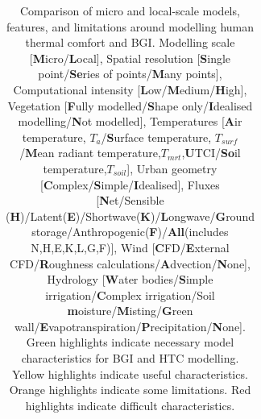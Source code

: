 \begin{table}
\begin{tabular}{c c c c c c c c c c c}
\end{tabular}
\caption{\label{tab:modelcompare}Comparison of micro and local-scale models, features, and limitations around modelling human thermal comfort and BGI. Modelling scale [\textbf{M}icro/\textbf{L}ocal], Spatial resolution [\textbf{S}ingle point/\textbf{Se}ries of points/\textbf{M}any points], Computational intensity [\textbf{L}ow/\textbf{M}edium/\textbf{H}igh], Vegetation [\textbf{F}ully modelled/\textbf{S}hape only/\textbf{I}dealised modelling/\textbf{N}ot modelled], Temperatures [\textbf{A}ir temperature, $T_{a}$/\textbf{S}urface temperature, $T_{surf}$/\textbf{M}ean radiant temperature,$T_{mrt}$,\textbf{U}TCI/\textbf{So}il temperature,$T_{soil}$], Urban geometry [\textbf{C}omplex/\textbf{S}imple/\textbf{I}dealised], Fluxes [\textbf{N}et/Sensible (\textbf{H})/Latent(\textbf{E})/Shortwave(\textbf{K})/\textbf{L}ongwave/\textbf{G}round storage/Anthropogenic(\textbf{F})/\textbf{All}(includes N,H,E,K,L,G,F)], Wind [\textbf{C}FD/\textbf{E}xternal CFD/\textbf{R}oughness calculations/\textbf{A}dvection/\textbf{N}one], Hydrology [\textbf{W}ater bodies/\textbf{S}imple irrigation/\textbf{C}omplex irrigation/Soil \textbf{m}oisture/\textbf{M}isting/\textbf{G}reen wall/\textbf{E}vapotranspiration/\textbf{P}recipitation/\textbf{N}one]. Green highlights indicate necessary model characteristics for BGI and HTC modelling. Yellow highlights indicate useful characteristics. Orange highlights indicate some limitations. Red highlights indicate difficult characteristics.}
\end{table}

